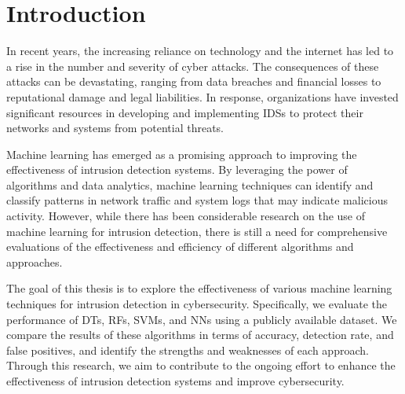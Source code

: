 \chapter{Introduction}  

In recent years, the increasing reliance on technology and the internet has led to a rise in the number and severity of cyber attacks. The consequences of these attacks can be devastating, ranging from data breaches and financial losses to reputational damage and legal liabilities. In response, organizations have invested significant resources in developing and implementing \acp{IDS} to protect their networks and systems from potential threats.

Machine learning has emerged as a promising approach to improving the effectiveness of intrusion detection systems. By leveraging the power of algorithms and data analytics, machine learning techniques can identify and classify patterns in network traffic and system logs that may indicate malicious activity. However, while there has been considerable research on the use of machine learning for intrusion detection, there is still a need for comprehensive evaluations of the effectiveness and efficiency of different algorithms and approaches.

The goal of this thesis is to explore the effectiveness of various machine learning techniques for intrusion detection in cybersecurity. Specifically, we evaluate the performance of \acp{DT}, \acp{RF}, \acp{SVM}, and \acp{NN} using a publicly available dataset. We compare the results of these algorithms in terms of accuracy, detection rate, and false positives, and identify the strengths and weaknesses of each approach. Through this research, we aim to contribute to the ongoing effort to enhance the effectiveness of intrusion detection systems and improve cybersecurity.
